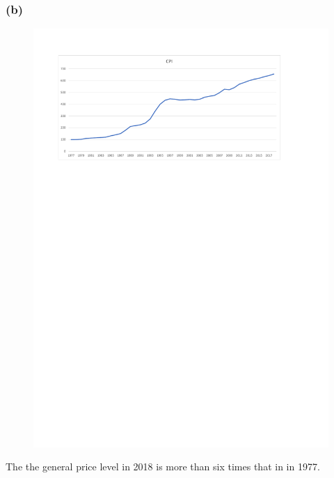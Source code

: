 \documentclass[UTF8]{ctexart}
\begin{document}
\subsubsection*{(b)}
\begin{figure}[H]
    \centering
    \includegraphics[width=15cm]{CPI.pdf}
\end{figure}
The the general price level in 2018 is more than six times that in in 1977.
\end{document}
